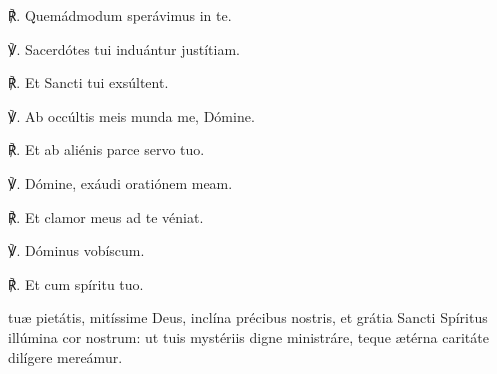 {℟. Quemádmodum sperávimus in te.\par
℣. Sacerdótes tui induántur justítiam.\par
℟. Et Sancti tui exsúltent.\par
℣. Ab occúltis meis munda me, Dómine.\par
℟. Et ab aliénis parce servo tuo.\par
℣. Dómine, exáudi oratiónem meam.\par
℟. Et clamor meus ad te véniat.\par
℣. Dóminus vobíscum.\par
℟. Et cum spíritu tuo.\par
\oremuslatin
{} tu{\ae} pietátis, mitíssime Deus, inclína précibus nostris, et grátia Sancti Spíritus illúmina cor nostrum: ut tuis mystériis digne ministráre, teque {\ae}térna caritáte dilígere mereámur.}

